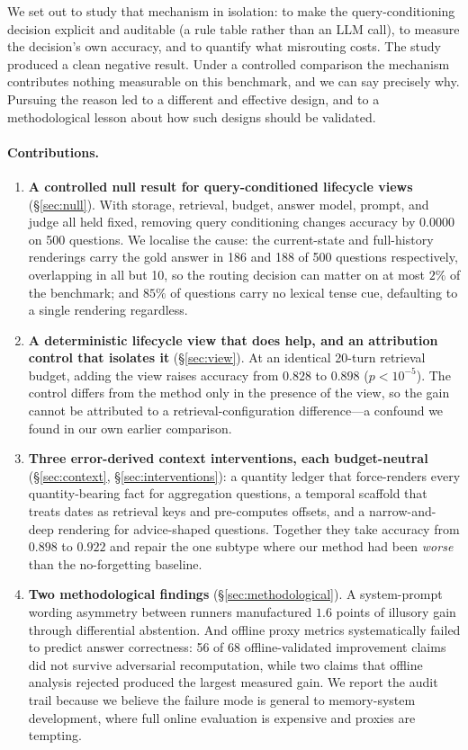 \documentclass[11pt]{article}
\begin{document}
We set out to study that mechanism in isolation: to make the query-conditioning decision explicit and auditable (a rule table rather than an LLM call), to measure the decision's own accuracy, and to quantify what misrouting costs. The study produced a clean negative result. Under a controlled comparison the mechanism contributes nothing measurable on this benchmark, and we can say precisely why. Pursuing the reason led to a different and effective design, and to a methodological lesson about how such designs should be validated.

\paragraph{Contributions.}
\begin{enumerate}
\item \textbf{A controlled null result for query-conditioned lifecycle views} (\S\ref{sec:null}). With storage, retrieval, budget, answer model, prompt, and judge all held fixed, removing query conditioning changes accuracy by $0.0000$ on 500 questions. We localise the cause: the current-state and full-history renderings carry the gold answer in 186 and 188 of 500 questions respectively, overlapping in all but 10, so the routing decision can matter on at most $2\%$ of the benchmark; and $85\%$ of questions carry no lexical tense cue, defaulting to a single rendering regardless.

\item \textbf{A deterministic lifecycle view that does help, and an attribution control that isolates it} (\S\ref{sec:view}). At an identical 20-turn retrieval budget, adding the view raises accuracy from $0.828$ to $0.898$ ($p < 10^{-5}$). The control differs from the method only in the presence of the view, so the gain cannot be attributed to a retrieval-configuration difference---a confound we found in our own earlier comparison.

\item \textbf{Three error-derived context interventions, each budget-neutral} (\S\ref{sec:context}, \S\ref{sec:interventions}): a quantity ledger that force-renders every quantity-bearing fact for aggregation questions, a temporal scaffold that treats dates as retrieval keys and pre-computes offsets, and a narrow-and-deep rendering for advice-shaped questions. Together they take accuracy from $0.898$ to $0.922$ and repair the one subtype where our method had been \emph{worse} than the no-forgetting baseline.

\item \textbf{Two methodological findings} (\S\ref{sec:methodological}). A system-prompt wording asymmetry between runners manufactured $1.6$ points of illusory gain through differential abstention. And offline proxy metrics systematically failed to predict answer correctness: 56 of 68 offline-validated improvement claims did not survive adversarial recomputation, while two claims that offline analysis rejected produced the largest measured gain. We report the audit trail because we believe the failure mode is general to memory-system development, where full online evaluation is expensive and proxies are tempting.
\end{enumerate}
\end{document}
